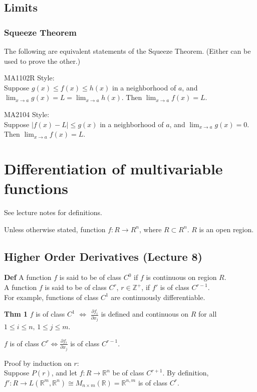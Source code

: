 \documentclass{article}
\begin{document}
\subsection{Limits}
\subsubsection{Squeeze Theorem}
The following are equivalent statements of the Squeeze Theorem. (Either can be used to prove the other.)

MA1102R Style:\\
Suppose $g(x)\leq f(x)\leq h(x)$ in a neighborhood of $a$, and $\lim_{x\rightarrow a}g(x)=L=\lim_{x\rightarrow a}h(x)$. Then $\lim_{x\rightarrow a}f(x)=L$.

MA2104 Style:\\
Suppose $|f(x)-L|\leq g(x)$ in a neighborhood of $a$, and $\lim_{x\rightarrow a}g(x)=0$. Then $\lim_{x\rightarrow a}f(x)=L$.


\section{Differentiation of multivariable functions}
See lecture notes for definitions.

Unless otherwise stated, function $f: R\rightarrow R^n$, where $R\subset R^n$. $R$ is an open region.

\subsection{Higher Order Derivatives (Lecture 8)}
\textbf{Def} A function $f$ is said to be of class $C^0$ if $f$ is continuous on region $R$.\\
A function $f$ is said to be of class $C^r$, $r\in \mathbb{Z^+}$, if $f'$ is of class $C^{r-1}$.\\
For example, functions of class $C^1$ are continuously differentiable.

\textbf{Thm 1} $f$ is of class $C^1$ $\iff$ $\frac{\partial f_i}{\partial x_j}$ is defined and continuous on $R$ for all $1\leq i\leq n,\, 1\leq j \leq m$. 


$f$ is of class $C^r \iff \frac{\partial f_i}{\partial x_j}$ is of class $C^{r-1}$.

Proof by induction on $r$:\\
Suppose $P(r)$, and let $f: R\rightarrow \mathbb{R}^n$ be of class $C^{r+1}$. By definition, $f': R \rightarrow L(\mathbb{R}^m, \mathbb{R}^n) \cong M_{n\times m}(\mathbb{R}) = \mathbb{R}^{n,m}$ is of class $C^r$.
\end{document}
